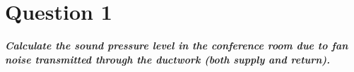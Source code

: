 \section{Question 1}

\textbf{\textit{Calculate the sound pressure level in the conference room due to fan noise transmitted through the ductwork (both supply and return).}}



